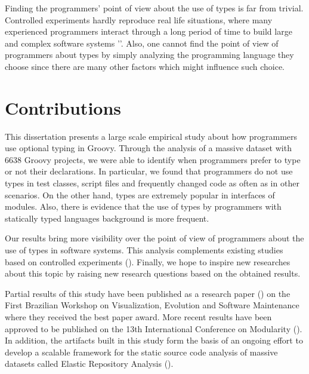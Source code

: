 \documentclass[msc]{ppgccufmg}
\begin{document}
Finding the programmers' point of view about the use of types is far from trivial.
Controlled experiments hardly reproduce real life situations, where many experienced programmers interact through a long period of time to build large and complex software systems '\cite{Wohlin2012}'.
Also, one cannot find the point of view of programmers about types by simply analyzing the programming language they choose since there are many other factors which might influence such choice.




\section{Contributions}
This dissertation presents a large scale empirical study about how programmers use optional typing in Groovy.
Through the analysis of a massive dataset with 6638 Groovy projects, we were able to identify when programmers prefer to type or not their declarations. 
In particular, we found that programmers do not use types in test classes, script files and frequently changed code as often as in other scenarios.
On the other hand, types are extremely popular in interfaces of modules.
Also, there is evidence that the use of types by programmers with statically typed languages background is more frequent.

Our results bring more visibility over the point of view of programmers about the use of types in software systems.
This analysis complements existing studies based on controlled experiments (\cite{Hanenberg13, ruby_vs_druby, experiment_with_purity, hanenberg_icpc, mayer2012static, Gannon77, Prechelt98}).
Finally, we hope to inspire new researches about this topic by raising new research questions based on the obtained results.

Partial results of this study have been published as a research paper (\cite{souza_vem2013}) on the First Brazilian Workshop on Visualization, Evolution and Software Maintenance  where they received the best paper award.
More recent results have been approved to be published on the 13th International Conference on Modularity (\cite{souza_aosd2014}).
In addition, the artifacts built in this study form the basis of an ongoing effort to develop a scalable framework for the static source code analysis of massive datasets called Elastic Repository Analysis (\cite{era}).

\end{document}
